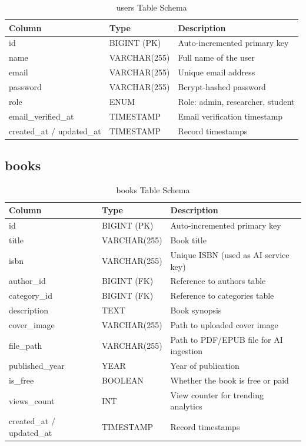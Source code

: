 \begin{table}[H]
\centering
\caption{users Table Schema}
\begin{tabularx}{\textwidth}{|l|l|X|}
\hline
\textbf{Column} & \textbf{Type} & \textbf{Description} \\
\hline
id                   & BIGINT (PK)    & Auto-incremented primary key \\
\hline
name                 & VARCHAR(255)   & Full name of the user \\
\hline
email                & VARCHAR(255)   & Unique email address \\
\hline
password             & VARCHAR(255)   & Bcrypt-hashed password \\
\hline
role                 & ENUM           & Role: admin, researcher, student \\
\hline
email\_verified\_at  & TIMESTAMP      & Email verification timestamp \\
\hline
created\_at / updated\_at & TIMESTAMP & Record timestamps \\
\hline
\end{tabularx}
\end{table}

\subsection{books}

\begin{table}[H]
\centering
\caption{books Table Schema}
\begin{tabularx}{\textwidth}{|l|l|X|}
\hline
\textbf{Column} & \textbf{Type} & \textbf{Description} \\
\hline
id             & BIGINT (PK)   & Auto-incremented primary key \\
\hline
title          & VARCHAR(255)  & Book title \\
\hline
isbn           & VARCHAR(255)  & Unique ISBN (used as AI service key) \\
\hline
author\_id     & BIGINT (FK)   & Reference to authors table \\
\hline
category\_id   & BIGINT (FK)   & Reference to categories table \\
\hline
description    & TEXT          & Book synopsis \\
\hline
cover\_image   & VARCHAR(255)  & Path to uploaded cover image \\
\hline
file\_path     & VARCHAR(255)  & Path to PDF/EPUB file for AI ingestion \\
\hline
published\_year & YEAR         & Year of publication \\
\hline
is\_free       & BOOLEAN       & Whether the book is free or paid \\
\hline
views\_count   & INT           & View counter for trending analytics \\
\hline
created\_at / updated\_at & TIMESTAMP & Record timestamps \\
\hline
\end{tabularx}
\end{table}

